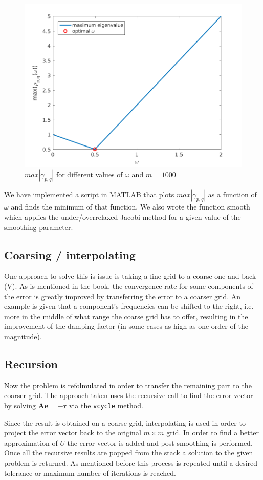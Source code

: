 \documentclass[main.tex]{subfiles}
\begin{document}
\begin{figure}[h]
    \centering
    \includegraphics[width=\textwidth]{../Figures/omegaopt}
    \caption{$max |\gamma_{p,q}|$ for different values of $\omega$ and $m = 1000$}
    \label{fig:omegaopt}
\end{figure}

We have implemented a script in MATLAB that plots $max |\gamma_{p,q}|$ as a function of $\omega$ and finds the minimum of that function. We also wrote the function smooth which applies the under/overrelaxed Jacobi method for a given value of the smoothing parameter.

\subsection{Coarsing / interpolating}
One approach to solve this is issue is taking a fine grid to a coarse one and back (V). As is mentioned in the book, the convergence rate for some components of the error is greatly improved by transferring the error to a coarser grid. An example is given that a component's frequencies can be shifted to the right, i.e. more in the middle of what range the coarse grid has to offer, resulting in the improvement of the damping factor (in some cases as high as one order of the magnitude).

\subsection{Recursion}
Now the problem is refolmulated in order to transfer the remaining part to the coarser grid. The approach taken uses the recursive call to find the error vector by solving $\mathbf{A e} = \mathbf{-r}$ via the \texttt{vcycle} method.

Since the result is obtained on a coarse grid, interpolating is used in order to project the error vector back to the original $m \times m$ grid. In order to find a better approximation of $U$ the error vector is added and post-smoothing is performed. Once all the recursive results are popped from the stack a solution to the given problem is returned. As mentioned before this process is repeated until a desired tolerance or maximum number of iterations is reached. 

    
\end{document}
